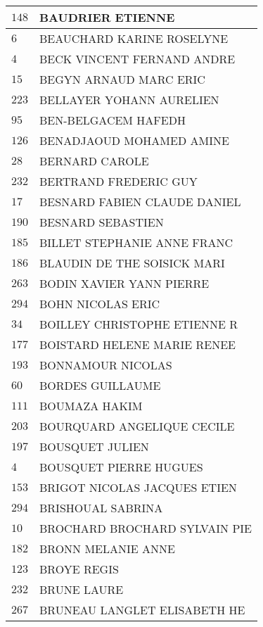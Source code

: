 \begin{xltabular}{\linewidth}{|l|X|}
    $148$ & BAUDRIER ETIENNE \\
    \hline
    $6$ & BEAUCHARD KARINE ROSELYNE \\
    \hline
    $4$ & BECK VINCENT FERNAND ANDRE \\
    \hline
    $15$ & BEGYN ARNAUD MARC ERIC \\
    \hline
    $223$ & BELLAYER YOHANN AURELIEN \\
    \hline
    $95$ & BEN-BELGACEM HAFEDH \\
    \hline
    $126$ & BENADJAOUD MOHAMED AMINE \\
    \hline
    $28$ & BERNARD CAROLE \\
    \hline
    $232$ & BERTRAND FREDERIC GUY \\
    \hline
    $17$ & BESNARD FABIEN CLAUDE DANIEL \\
    \hline
    $190$ & BESNARD SEBASTIEN \\
    \hline
    $185$ & BILLET STEPHANIE ANNE FRANC \\
    \hline
    $186$ & BLAUDIN DE THE SOISICK MARI \\
    \hline
    $263$ & BODIN XAVIER YANN PIERRE \\
    \hline
    $294$ & BOHN NICOLAS ERIC \\
    \hline
    $34$ & BOILLEY CHRISTOPHE ETIENNE R \\
    \hline
    $177$ & BOISTARD HELENE MARIE RENEE \\
    \hline
    $193$ & BONNAMOUR NICOLAS \\
    \hline
    $60$ & BORDES GUILLAUME \\
    \hline
    $111$ & BOUMAZA HAKIM \\
    \hline
    $203$ & BOURQUARD ANGELIQUE CECILE \\
    \hline
    $197$ & BOUSQUET JULIEN \\
    \hline
    $4$ & BOUSQUET PIERRE HUGUES \\
    \hline
    $153$ & BRIGOT NICOLAS JACQUES ETIEN \\
    \hline
    $294$ & BRISHOUAL SABRINA \\
    \hline
    $10$ & BROCHARD BROCHARD SYLVAIN PIE \\
    \hline
    $182$ & BRONN MELANIE ANNE \\
    \hline
    $123$ & BROYE REGIS \\
    \hline
    $232$ & BRUNE LAURE \\
    \hline
    $267$ & BRUNEAU LANGLET ELISABETH HE \\

\end{xltabular}
